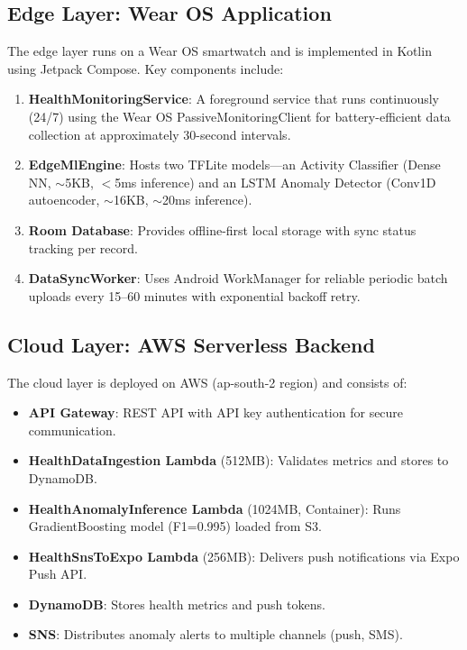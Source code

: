 \documentclass[conference]{IEEEtran}
\begin{document}
\subsection{Edge Layer: Wear OS Application}
The edge layer runs on a Wear OS smartwatch and is implemented in Kotlin using Jetpack Compose. Key components include:

\begin{enumerate}
    \item \textbf{HealthMonitoringService}: A foreground service that runs continuously (24/7) using the Wear OS PassiveMonitoringClient for battery-efficient data collection at approximately 30-second intervals.
    \item \textbf{EdgeMlEngine}: Hosts two TFLite models---an Activity Classifier (Dense NN, $\sim$5KB, $<$5ms inference) and an LSTM Anomaly Detector (Conv1D autoencoder, $\sim$16KB, $\sim$20ms inference).
    \item \textbf{Room Database}: Provides offline-first local storage with sync status tracking per record.
    \item \textbf{DataSyncWorker}: Uses Android WorkManager for reliable periodic batch uploads every 15--60 minutes with exponential backoff retry.
\end{enumerate}

\subsection{Cloud Layer: AWS Serverless Backend}
The cloud layer is deployed on AWS (ap-south-2 region) and consists of:

\begin{itemize}
    \item \textbf{API Gateway}: REST API with API key authentication for secure communication.
    \item \textbf{HealthDataIngestion Lambda} (512MB): Validates metrics and stores to DynamoDB.
    \item \textbf{HealthAnomalyInference Lambda} (1024MB, Container): Runs GradientBoosting model (F1=0.995) loaded from S3.
    \item \textbf{HealthSnsToExpo Lambda} (256MB): Delivers push notifications via Expo Push API.
    \item \textbf{DynamoDB}: Stores health metrics and push tokens.
    \item \textbf{SNS}: Distributes anomaly alerts to multiple channels (push, SMS).
\end{itemize}
\end{document}
